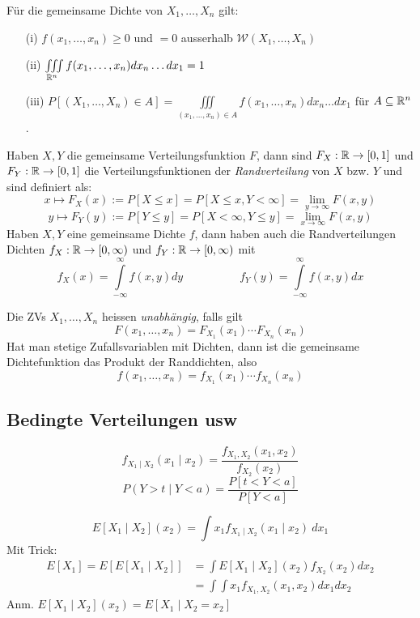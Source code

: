 \begin{korollar}
Für die gemeinsame Dichte von $X_1,\dots,X_n$ gilt:
\begin{itemize}
\item[(i)] $f(x_1,\dots, x_n) \geq 0$ und $=0$ ausserhalb $\mathcal{W}(X_1, \dots, X_n)$
\item[(ii)] $ \iiint \limits_{\mathbb{R}^n} f(x_1, \dots, x_n) dx_n \dots dx_1 = 1$
\item[(iii)] $P[(X_1,\dots, X_n) \in A] = \iiint \limits_{(x_1,\dots,x_n) \in A} f(x_1, \dots, x_n) dx_n \dots dx_1$ für $A\subseteq \mathbb{R}^n$.
\end{itemize}
\end{korollar}

\begin{definition}
Haben $X,Y$ die gemeinsame Verteilungsfunktion $F$, dann sind $F_X:\mathbb{R}\to[0,1]$ und $F_Y:\mathbb{R}\to[0,1]$ die Verteilungsfunktionen der \textit{Randverteilung} von $X$ bzw. $Y$ und sind definiert als:
$$ x \mapsto F_X(x) := P[X \leq x] = P[X \leq x, Y < \infty] = \lim_{y\to \infty} F(x,y)$$
$$ y \mapsto F_Y(y) := P[Y \leq y] = P[X < \infty, Y \leq y] = \lim_{x\to \infty} F(x,y)$$
Haben $X,Y$ eine gemeinsame Dichte $f$, dann haben auch die Randverteilungen Dichten $f_X:\mathbb{R}\to [0, \infty)$ und $f_Y:\mathbb{R} \to [0, \infty)$ mit
$$ f_X(x) = \int\limits_{-\infty}^{\infty} f(x,y) dy \quad \quad \quad \quad \quad f_Y(y) = \int \limits_{-\infty}^{\infty} f(x,y) dx$$
\end{definition}

\begin{definition}
Die ZVs $X_1,\dots,X_n$ heissen \textit{unabhängig}, falls gilt
$$F(x_1,\dots,x_n) = F_{X_1}(x_1) \cdots F_{X_n}(x_n)$$
Hat man stetige Zufallsvariablen mit Dichten, dann ist die gemeinsame Dichtefunktion das Produkt der Randdichten, also
$$ f(x_1, \dots, x_n) = f_{X_1}(x_1) \cdots f_{X_n}(x_n)$$
\end{definition}

\subsection{Bedingte Verteilungen usw}

\begin{definition}

$$ f_{X_1 \mid X_2}(x_1\mid x_2) = \frac{f_{X_1, X_2}(x_1, x_2)}{f_{X_2}(x_2)}$$
$$ P(Y > t\mid Y < a) = \frac{P[t < Y < a]}{P[Y < a]}$$

$$ E[X_1 \mid X_2](x_2) = \int x_1 f_{X_1 \mid X_2}(x_1\mid x_2)\ dx_1$$
Mit Trick:
\begin{align*}
	E[X_1] = E[E[X_1 \mid X_2]] &= \int E[X_1 \mid X_2](x_2) f_{X_2}(x_2) dx_2\\
	&=\int \int x_1 f_{X_1, X_2}(x_1, x_2) dx_1 dx_2
\end{align*}
Anm. $E[X_1 \mid X_2](x_2) = E[X_1 \mid X_2=x_2]$ 
\end{definition}

